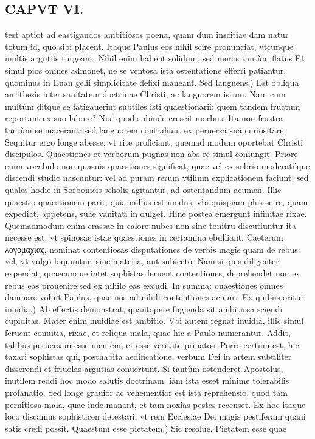 \documentclass{article}
\begin{document}
\begin{pages}
\section*{CAPVT VI. }
\marginpar{[ p.75 ]}\pstart test aptiot ad eastigandos ambitiosos poena, quam dum inscitiae dam natur totum id, quo sibi placent. Itaque Paulus eos nihil scire pronunciat, vtcunque multis argutiis turgeant. Nihil enim habent solidum, sed meros tantùm flatus Et simul pios omnes admonet, ne se ventosa ista ostentatione efferri patiantur, quominus in Euan gelii simplicitate defixi maneant.  \pend\pstart Sed languens.) Est obliqua antithesis inter sanitatem doctrinae Christi, ac languorem istum. Nam cum multùm ditque se fatigauerint subtiles isti quaestionarii: quem tandem fructum reportant ex suo labore? Nisi quod subinde crescit morbus. Ita non frustra tantùm se macerant: sed languorem contrahunt ex peruersa sua curiositare. Sequitur ergo longe abesse, vt rite proficiant, quemad modum oportebat Christi discipulos. Quaestiones et verborum pugnas non abs re simul coniungit. Priore enim vocabulo non quasuis quaestiones significat, quae vel ex sobrio moderatóque discendi studio nascuntur: vel ad puram rerum vtilinm explicationem faciunt: sed quales hodie in Sorbonicis scholis agitantur, ad ostentandum acumen. Illic quaestio quaestionem parit; quia nullus est modus, vbi quispiam plus scire, quam expediat, appetens, suae vanitati in dulget. Hine postea emergunt infinitae rixae. Quemadmodum enim crassae in calore nubes non sine tonitru discutiuntur ita necesse est, vt spinosae istae quaestiones in certamina ebulliant. Caeterum λογομαχίας, nominat contentiosas disputationes de verbis magis quam de rebus: vel, vt vulgo loquuntur, sine materia, aut subiecto. Nam si quis diligenter expendat, quaecunque intet sophistas feruent contentiones, deprehendet non ex rebus eas prouenire:sed ex nihilo eas excudi. In summa: quaestiones omnes damnare voluit Paulus, quae nos ad nihili contentiones acuunt.  \pend\pstart Ex quibus oritur inuidia.) Ab effectis demonstrat, quantopere fugienda sit ambitiosa sciendi cupiditas. Mater enim inuidiae est ambitio. Vbi autem regnat inuidia, illic simul feruent conuitia, rixae, et reliqua mala, quae hic a Paulo numerantur. Addit, talibus peruersam esse mentem, et esse veritate priuatos. Porro certum est, hic taxari sophistas qui, posthabita aedificatione, verbum Dei in artem subtiliter disserendi et friuolas argutias conuertunt. Si tantùm ostenderet Apostolus, inutilem reddi hoc modo salutis doctrinam: iam ista esset minime tolerabilis profanatio. Sed longe grauior ac vehementior est ista reprehensio, quod tam pernitiosa mala, quae inde manant, et tam noxias pestes recenset. Ex hoc itaque loco discamus sophisticen detestari, vt rem Ecclesiae Dei magis pestiferam quani satis credi possit.  \pend\pstart Quaestum esse pietatem.) Sic resolue. Pietatem esse quae\pend

\end{pages}
\end{document}
